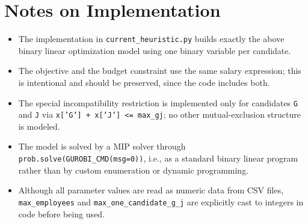\section*{Notes on Implementation}

\begin{itemize}
    \item The implementation in \texttt{current\_heuristic.py} builds exactly the above binary linear optimization model using one binary variable per candidate.
    \item The objective and the budget constraint use the same salary expression; this is intentional and should be preserved, since the code includes both.
    \item The special incompatibility restriction is implemented only for candidates \texttt{G} and \texttt{J} via \texttt{x['G'] + x['J'] <= max\_gj}; no other mutual-exclusion structure is modeled.
    \item The model is solved by a MIP solver through \texttt{prob.solve(GUROBI\_CMD(msg=0))}, i.e., as a standard binary linear program rather than by custom enumeration or dynamic programming.
    \item Although all parameter values are read as numeric data from CSV files, \texttt{max\_employees} and \texttt{max\_one\_candidate\_g\_j} are explicitly cast to integers in code before being used.
\end{itemize}
